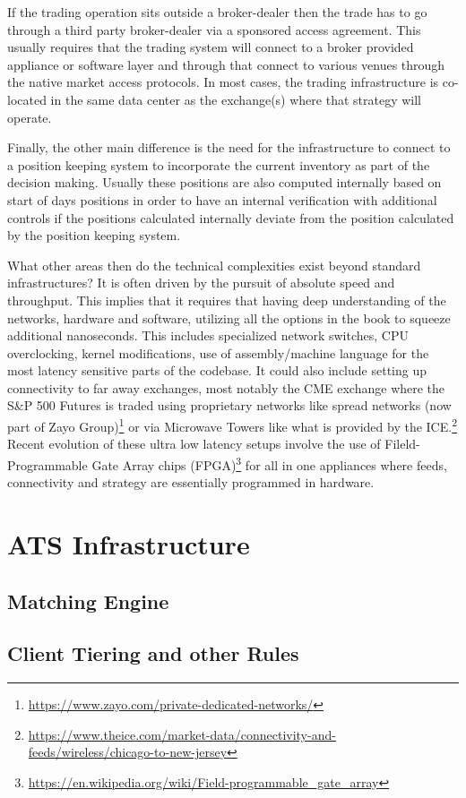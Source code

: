 If the trading operation sits outside a broker-dealer then the trade has to go through a third party broker-dealer via a sponsored access agreement. This usually requires that the trading system will connect to a broker provided appliance or software layer and through that connect to various venues through the native market access protocols. In most cases, the trading infrastructure is co-located in the same data center as the exchange(s) where that strategy will operate.


Finally, the other main difference is the need for the infrastructure to connect to a position keeping system to incorporate the current inventory as part of the decision making. Usually these positions are also computed internally based on start of days positions in order to have an internal verification with additional controls if the positions calculated internally deviate from the position calculated by the position keeping system.


What other areas then do the technical complexities exist beyond standard infrastructures? It is often driven by the pursuit of absolute speed and throughput. This implies that it requires that having deep understanding of the networks, hardware and software, utilizing all the options in the book to squeeze additional nanoseconds. This includes specialized network switches, CPU overclocking, kernel modifications, use of assembly/machine language for the most latency sensitive parts of the codebase. It could also include setting up connectivity to far away exchanges, most notably the CME exchange where the S\&P 500 Futures is traded using proprietary networks like spread networks (now part of Zayo Group)\footnote{\url{https://www.zayo.com/private-dedicated-networks/}} or via Microwave Towers like what is provided by the ICE.\footnote{\url{https://www.theice.com/market-data/connectivity-and-feeds/wireless/chicago-to-new-jersey}} Recent evolution of these ultra low latency setups involve the use of Fileld-Programmable Gate Array chips (FPGA)\footnote{\url{https://en.wikipedia.org/wiki/Field-programmable_gate_array}} for all in one appliances where  feeds, connectivity and strategy are essentially programmed in hardware.


\section{ATS Infrastructure}
\subsection{Matching Engine}
\subsection{Client Tiering and other Rules}



















